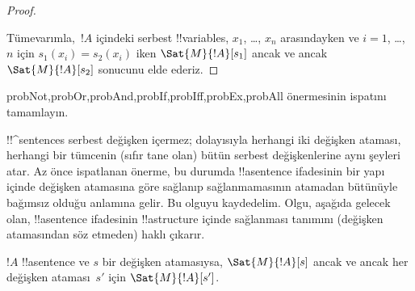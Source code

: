 \documentclass[../../../include/open-logic-section]{subfiles}
\begin{document}
\begin{proof}
\begin{enumerate}
\end{enumerate}
Tümevarımla,~$!A$ içindeki serbest !!{variable}s, $x_1$, \dots, $x_n$
arasındayken ve $i = 1$, \dots,~$n$ için $s_1(x_i)=s_2(x_i)$ iken
$\Sat{M}{!A}[s_1]$ ancak ve ancak $\Sat{M}{!A}[s_2]$ sonucunu elde
ederiz.
\end{proof}

\begin{probtag}{probNot,probOr,probAnd,probIf,probIff,probEx,probAll}
 önermesinin ispatını tamamlayın.
\end{probtag}

\begin{explain}
!!^{sentence}s serbest değişken içermez; dolayısıyla herhangi iki
değişken ataması, herhangi bir tümcenin (sıfır tane olan) bütün serbest
değişkenlerine aynı şeyleri atar. Az önce ispatlanan önerme, bu durumda
!!a{sentence} ifadesinin bir yapı içinde değişken atamasına göre
sağlanıp sağlanmamasının atamadan bütünüyle bağımsız olduğu anlamına
gelir. Bu olguyu kaydedelim. Olgu, aşağıda gelecek olan, !!a{sentence}
ifadesinin !!a{structure} içinde sağlanması tanımını (değişken
atamasından söz etmeden) haklı çıkarır.
\end{explain}

\begin{cor}
$!A$ !!a{sentence} ve $s$ bir değişken atamasıysa,
$\Sat{M}{!A}[s]$ ancak ve ancak her değişken ataması~$s'$ için
$\Sat{M}{!A}[s']$.
\end{cor}
\end{document}
